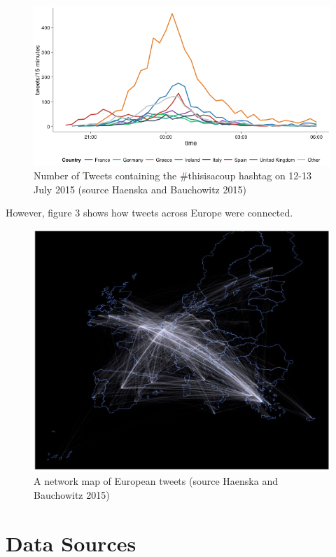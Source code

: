 \documentclass[]{article}
\begin{document}
\begin{figure}[htbp]
\centering
\includegraphics{../../img/Greece-twitter-2.png}
\caption{Number of Tweets containing the \#thisisacoup hashtag on 12-13
July 2015 (source Haenska and Bauchowitz 2015)}
\end{figure}

However, figure 3 shows how tweets across Europe were connected.

\begin{figure}[htbp]
\centering
\includegraphics{../../img/Greece-twitter-3.jpg}
\caption{A network map of European tweets (source Haenska and Bauchowitz
2015)}
\end{figure}

\section{Data Sources}\label{data-sources}
\end{document}
